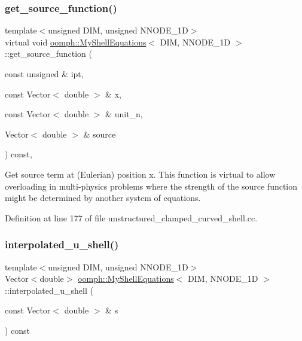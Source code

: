 \subsubsection{\texorpdfstring{get\+\_\+source\+\_\+function()}{get\_source\_function()}}
{\footnotesize\ttfamily template$<$unsigned D\+IM, unsigned N\+N\+O\+D\+E\+\_\+1D$>$ \\
virtual void \hyperlink{classoomph_1_1MyShellEquations}{oomph\+::\+My\+Shell\+Equations}$<$ D\+IM, N\+N\+O\+D\+E\+\_\+1D $>$\+::get\+\_\+source\+\_\+function (\begin{DoxyParamCaption}\item[{const unsigned \&}]{ipt,  }\item[{const Vector$<$ double $>$ \&}]{x,  }\item[{const Vector$<$ double $>$ \&}]{unit\+\_\+n,  }\item[{Vector$<$ double $>$ \&}]{source }\end{DoxyParamCaption}) const\hspace{0.3cm}{\ttfamily [inline]}, {\ttfamily [virtual]}}

Get source term at (Eulerian) position x. This function is virtual to allow overloading in multi-\/physics problems where the strength of the source function might be determined by another system of equations. 

Definition at line 177 of file unstructured\+\_\+clamped\+\_\+curved\+\_\+shell.\+cc.

\mbox{\label{classoomph_1_1MyShellEquations_a6f170026c39f99db20110a6d6e76e6c0}} 
\subsubsection{\texorpdfstring{interpolated\+\_\+u\+\_\+shell()}{interpolated\_u\_shell()}}
{\footnotesize\ttfamily template$<$unsigned D\+IM, unsigned N\+N\+O\+D\+E\+\_\+1D$>$ \\
Vector$<$double$>$ \hyperlink{classoomph_1_1MyShellEquations}{oomph\+::\+My\+Shell\+Equations}$<$ D\+IM, N\+N\+O\+D\+E\+\_\+1D $>$\+::interpolated\+\_\+u\+\_\+shell (\begin{DoxyParamCaption}\item[{const Vector$<$ double $>$ \&}]{s }\end{DoxyParamCaption}) const\hspace{0.3cm}{\ttfamily [inline]}}



